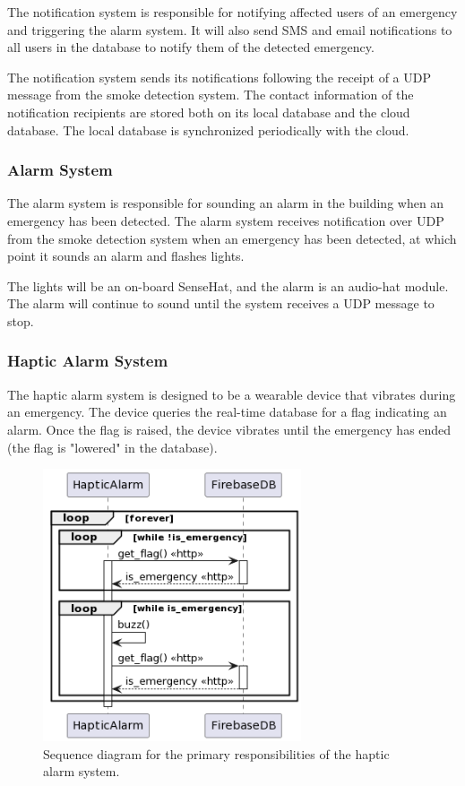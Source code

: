 The notification system is responsible for notifying affected users of an emergency and triggering the alarm system. It
will also send SMS and email notifications to all users in the database to notify them of the detected emergency.

The notification system sends its notifications following the receipt of a UDP message from the smoke detection system.
The contact information of the notification recipients are stored both on its local database and the cloud database.
The local database is synchronized periodically with the cloud.

\subsubsection{Alarm System}

The alarm system is responsible for sounding an alarm in the building when an emergency has been detected. The alarm
system receives notification over UDP from the smoke detection system when an emergency has been detected, at which
point it sounds an alarm and flashes lights.

The lights will be an on-board SenseHat, and the alarm is an audio-hat module. The alarm will continue to sound until
the system receives a UDP message to stop.

\subsubsection{Haptic Alarm System}

The haptic alarm system is designed to be a wearable device that vibrates during an emergency. The device queries the
real-time database for a flag indicating an alarm. Once the flag is raised, the device vibrates until the emergency has
ended (the flag is "lowered" in the database).

\begin{figure}[H]
    \centering
    \includegraphics[width=3in]{../assets/HapticAlarmSequence.png}
    \caption{Sequence diagram for the primary responsibilities of the haptic alarm system.}
    \label{fig:haptic-alarm-sq}
\end{figure}

